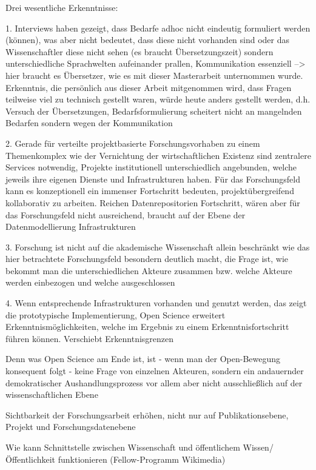 \onehalfspacing



Drei wesentliche Erkenntnisse:

1. Interviews haben gezeigt, dass Bedarfe adhoc nicht eindeutig formuliert werden (können), was aber nicht bedeutet, dass diese nicht vorhanden sind oder das Wissenschaftler diese nicht sehen (es braucht Übersetzungszeit) sondern unterschiedliche Sprachwelten aufeinander prallen, Kommunikation essenziell --> hier braucht es Übersetzer, wie es mit dieser Masterarbeit unternommen wurde. Erkenntnis, die persönlich aus dieser Arbeit mitgenommen wird, dass Fragen teilweise viel zu technisch gestellt waren, würde heute anders gestellt werden, d.h. Versuch der Übersetzungen, Bedarfsformulierung scheitert nicht an mangelnden Bedarfen sondern wegen der Kommunikation

2. Gerade für verteilte projektbasierte Forschungsvorhaben zu einem Themenkomplex wie der Vernichtung der wirtschaftlichen Existenz sind zentralere Services notwendig, Projekte institutionell unterschiedlich angebunden, welche jeweils ihre eigenen Dienste und Infrastrukturen haben. Für das Forschungsfeld kann es konzeptionell ein immenser Fortschritt bedeuten, projektübergreifend kollaborativ zu arbeiten. Reichen Datenrepositorien Fortschritt, wären aber für das Forschungsfeld nicht ausreichend, braucht auf der Ebene der Datenmodellierung Infrastrukturen

3. Forschung ist nicht auf die akademische Wissenschaft allein beschränkt wie das hier betrachtete Forschungsfeld besondern deutlich macht, die Frage ist, wie bekommt man die unterschiedlichen Akteure zusammen bzw. welche Akteure werden einbezogen und welche ausgeschlossen

4. Wenn entsprechende Infrastrukturen vorhanden und genutzt werden, das zeigt die prototypische Implementierung, Open Science erweitert Erkenntnismöglichkeiten, welche im Ergebnis zu einem Erkenntnisfortschritt führen können. Verschiebt Erkenntnisgrenzen


Denn was Open Science am Ende ist, ist - wenn man der Open-Bewegung konsequent folgt - keine Frage von einzelnen Akteuren, sondern ein andauernder demokratischer Aushandlungsprozess vor allem aber nicht ausschließlich auf der wissenschaftlichen Ebene


Sichtbarkeit der Forschungsarbeit erhöhen, nicht nur auf Publikationsebene, Projekt und Forschungsdatenebene

Wie kann Schnittstelle zwischen Wissenschaft und öffentlichem Wissen/ Öffentlichkeit funktionieren (Fellow-Programm Wikimedia)

